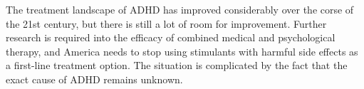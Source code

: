 \documentclass[a4paper,11pt]{article}
\begin{document}
  The treatment landscape of ADHD has improved considerably over the corse of the 21st century,
  but there is still a lot of room for improvement.
  Further research is required into the efficacy of combined medical and psychological therapy,
  and America needs to stop using stimulants with harmful side effects as a first-line treatment option.
  The situation is complicated by the fact that the exact cause of ADHD remains unknown.



  \nocite{ref2}
  
  
\end{document}
